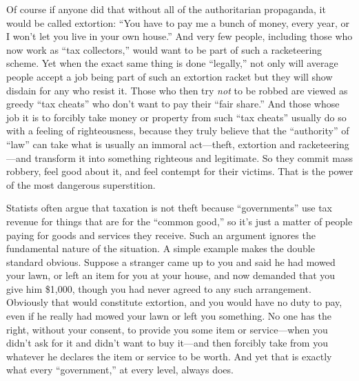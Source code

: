 \documentclass{book}
\begin{document}
Of course if anyone did that without all of the authoritarian propaganda, it would be called extortion: \enquote{You have to pay me a bunch of money, every year, or I won't let you live in your own house.} And very few people, including those who now work as \enquote{tax collectors,} would want to be part of such a racketeering scheme. Yet when the exact same thing is done \enquote{legally,} not only will average people accept a job being part of such an extortion racket but they will show disdain for any who resist it. Those who then try \emph{not} to be robbed are viewed as greedy \enquote{tax cheats} who don't want to pay their \enquote{fair share.} And those whose job it is to forcibly take money or property from such \enquote{tax cheats} usually do so with a feeling of righteousness, because they truly believe that the \enquote{authority} of \enquote{law} can take what is usually an immoral act---theft, extortion and racketeering---and transform it into something righteous and legitimate. So they commit mass robbery, feel good about it, and feel contempt for their victims. That is the power of the most dangerous superstition.

Statists often argue that taxation is not theft because \enquote{governments} use tax revenue for things that are for the \enquote{common good,} so it's just a matter of people paying for goods and services they receive. Such an argument ignores the fundamental nature of the situation. A simple example makes the double standard obvious. Suppose a stranger came up to you and said he had mowed your lawn, or left an item for you at your house, and now demanded that you give him \$1,000, though you had never agreed to any such arrangement. Obviously that would constitute extortion, and you would have no duty to pay, even if he really had mowed your lawn or left you something. No one has the right, without your consent, to provide you some item or service---when you didn't ask for it and didn't want to buy it---and then forcibly take from you whatever he declares the item or service to be worth. And yet that is exactly what every \enquote{government,} at every level, always does.
\end{document}
